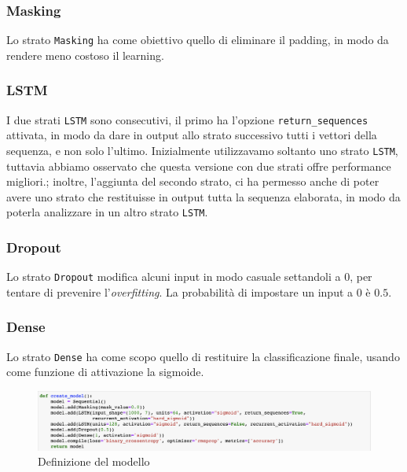 \documentclass[8pt,notitlepage]{report}
\begin{document}
				\subsubsection{Masking}
					Lo strato \verb|Masking| ha come obiettivo quello di eliminare il padding, in modo da rendere meno costoso il learning.
					
				\subsubsection{LSTM}
					I due strati \verb|LSTM| sono consecutivi, il primo ha l'opzione \verb|return_sequences| attivata, in modo da dare in output allo strato successivo tutti i vettori della sequenza, e non solo l'ultimo. Inizialmente utilizzavamo soltanto uno strato \verb|LSTM|, tuttavia abbiamo osservato che questa versione con due strati offre performance migliori.; inoltre, l'aggiunta del secondo strato, ci ha permesso anche di poter avere uno strato che restituisse in output tutta la sequenza elaborata, in modo da poterla analizzare in un altro strato \verb|LSTM|.
					
				\subsubsection{Dropout}
					Lo strato \verb|Dropout| modifica alcuni input in modo casuale settandoli a $ 0 $, per tentare di prevenire l'\textit{overfitting}. La probabilità di impostare un input a $ 0 $ è $ 0.5 $.
					
				\subsubsection{Dense}
					Lo strato \verb|Dense| ha come scopo quello di restituire la classificazione finale, usando come funzione di attivazione la sigmoide. 
			
	
			\begin{figure}
				\begin{center}
					\includegraphics[scale=.45]{def_model}
					\caption{Definizione del modello}
					\label{fig:model}
				\end{center}
			\end{figure}					
					
\end{document}
